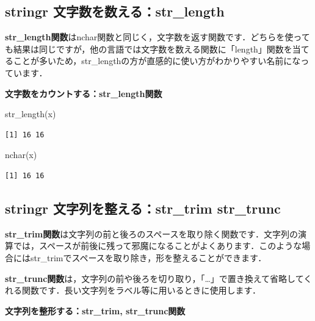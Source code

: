 \documentclass[
  letterpaper,
  DIV=11,
  numbers=noendperiod]{scrreprt}
\newenvironment{Shaded}{\begin{snugshade}}{\end{snugshade}}
\newcommand{\FunctionTok}[1]{\textcolor[rgb]{0.28,0.35,0.67}{#1}}
\newcommand{\NormalTok}[1]{\textcolor[rgb]{0.00,0.23,0.31}{#1}}
\begin{document}
\hypertarget{stringr-ux6587ux5b57ux6570ux3092ux6570ux3048ux308bstr_length}{%
\subsection{stringr
文字数を数える：str\_length}\label{stringr-ux6587ux5b57ux6570ux3092ux6570ux3048ux308bstr_length}}

\textbf{str\_length関数}はnchar関数と同じく，文字数を返す関数です．どちらを使っても結果は同じですが，他の言語では文字数を数える関数に「length」関数を当てることが多いため，str\_lengthの方が直感的に使い方がわかりやすい名前になっています．

\textbf{文字数をカウントする：str\_length関数}

\begin{Shaded}
\begin{Highlighting}[]
\FunctionTok{str\_length}\NormalTok{(x)}
\end{Highlighting}
\end{Shaded}

\begin{verbatim}
[1] 16 16
\end{verbatim}

\begin{Shaded}
\begin{Highlighting}[]
\FunctionTok{nchar}\NormalTok{(x)}
\end{Highlighting}
\end{Shaded}

\begin{verbatim}
[1] 16 16
\end{verbatim}

\hypertarget{stringr-ux6587ux5b57ux5217ux3092ux6574ux3048ux308bstr_trim-str_trunc}{%
\subsection{stringr 文字列を整える：str\_trim
str\_trunc}\label{stringr-ux6587ux5b57ux5217ux3092ux6574ux3048ux308bstr_trim-str_trunc}}

\textbf{str\_trim関数}は文字列の前と後ろのスペースを取り除く関数です．文字列の演算では，スペースが前後に残って邪魔になることがよくあります．このような場合にはstr\_trimでスペースを取り除き，形を整えることができます．

\textbf{str\_trunc関数}は，文字列の前や後ろを切り取り，「\ldots」で置き換えて省略してくれる関数です．長い文字列をラベル等に用いるときに使用します．

\textbf{文字列を整形する：str\_trim, str\_trunc関数}
\end{document}
